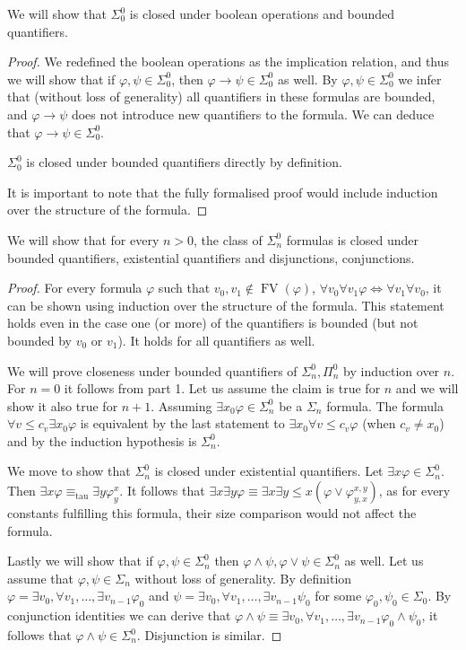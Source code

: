 \question{}
\subquestion{}
We will show that $\Sigma_0^0$ is closed under boolean operations and bounded quantifiers.
\begin{proof}
	We redefined the boolean operations as the implication relation, and thus we will show that if $\varphi, \psi \in \Sigma_0^0$, then $\varphi \to \psi \in \Sigma_0^0$ as well.
	By $\varphi, \psi \in \Sigma_0^0$ we infer that (without loss of generality) all quantifiers in these formulas are bounded, and $\varphi \to \psi$ does not introduce new quantifiers to the formula.
	We can deduce that $\varphi \to \psi \in \Sigma_0^0$.

	$\Sigma_0^0$ is closed under bounded quantifiers directly by definition.

	It is important to note that the fully formalised proof would include induction over the structure of the formula.
\end{proof}

\subquestion{}
We will show that for every $n > 0$, the class of $\Sigma_n^0$ formulas is closed under bounded quantifiers, existential quantifiers and disjunctions, conjunctions.
\begin{proof}
	For every formula $\varphi$ such that $v_0, v_1 \notin \operatorname{FV}(\varphi)$, $\forall v_0 \forall v_1 \varphi \iff \forall v_1 \forall v_0$, it can be shown using induction over the structure of the formula.
	This statement holds even in the case one (or more) of the quantifiers is bounded (but not bounded by $v_0$ or $v_1$).
	It holds for all quantifiers as well.

	We will prove closeness under bounded quantifiers of $\Sigma_n^0, \Pi_n^0$ by induction over $n$.
	For $n = 0$ it follows from part 1.
	Let us assume the claim is true for $n$ and we will show it also true for $n + 1$.
	Assuming $\exists x_0 \varphi \in \Sigma_n^0$ be a $\Sigma_n$ formula.
	The formula $\forall v \le c_v \exists x_0 \varphi$ is equivalent by the last statement to $\exists x_0 \forall v \le c_v \varphi$ (when $c_v \ne x_0$) and by the induction hypothesis is $\Sigma_n^0$.

	We move to show that $\Sigma_n^0$ is closed under existential quantifiers.
	Let $\exists x \varphi \in \Sigma_n^0$.
	Then $\exists x \varphi \equiv_{\text{tau}} \exists y \varphi_y^x$.
	It follows that $\exists x \exists y \varphi \equiv \exists x \exists y \le x (\varphi \lor \varphi_{y, x}^{x, y})$,
	as for every constants fulfilling this formula, their size comparison would not affect the formula.

	Lastly we will show that if $\varphi, \psi \in \Sigma_n^0$ then $\varphi \land \psi, \varphi \lor \psi \in \Sigma_n^0$ as well.
	Let us assume that $\varphi, \psi \in \Sigma_n$ without loss of generality.
	By definition $\varphi = \exists v_0, \forall v_1, \ldots, \exists v_{n - 1} \varphi_0$ and $\psi = \exists v_0, \forall v_1, \ldots, \exists v_{n - 1} \psi_0$ for some $\varphi_0, \psi_0 \in \Sigma_0$.
	By conjunction identities we can derive that $\varphi \land \psi \equiv \exists v_0, \forall v_1, \ldots, \exists v_{n - 1} \varphi_0 \land \psi_0$, it follows that $\varphi \land \psi \in \Sigma_n^0$.
	Disjunction is similar.
\end{proof}

